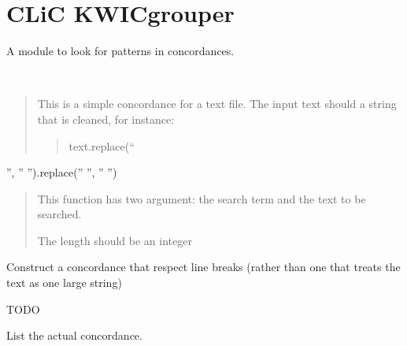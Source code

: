 \documentclass[letterpaper,10pt,english]{sphinxmanual}
\begin{document}
\section{CLiC KWICgrouper}
\label{apidoc:clic-kwicgrouper}\label{apidoc:module-kwicgrouper}
A module to look for patterns in concordances.

\begin{fulllineitems}
\label{apidoc:kwicgrouper.Concordance}~\begin{quote}

This is a simple concordance for a text file. The input text
should a string that is cleaned, for instance:
\begin{quote}

text.replace(``
\end{quote}
\end{quote}

'', '' '').replace(''  '', '' '')
\begin{quote}

This function has two argument: the search term and the
text to be searched.

The length should be an integer
\end{quote}

\begin{fulllineitems}
\label{apidoc:kwicgrouper.Concordance.from_multiple_line_file}
Construct a concordance that respect line breaks (rather than one
that treats the text as one large string)

TODO

\end{fulllineitems}


\begin{fulllineitems}
\label{apidoc:kwicgrouper.Concordance.list_concordance}
List the actual concordance.

\end{fulllineitems}


\end{fulllineitems}
\end{document}

